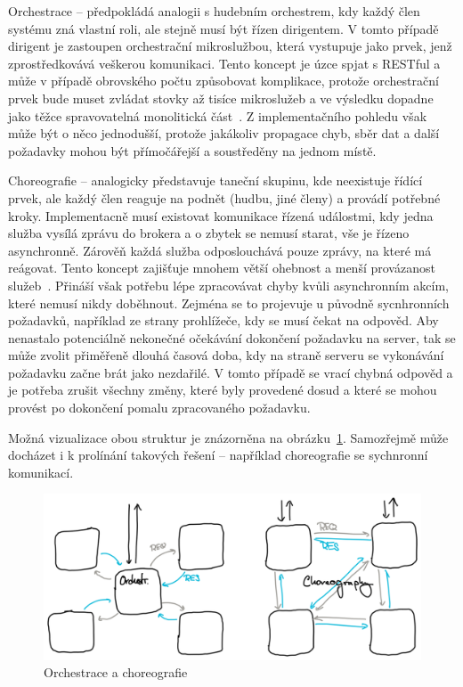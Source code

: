 \begin{dl}
   \item [Orchestrace] – předpokládá analogii s hudebním orchestrem, kdy každý člen systému zná vlastní roli, ale stejně musí být řízen dirigentem.
   V tomto případě dirigent je zastoupen orchestrační mikroslužbou, která vystupuje jako prvek, jenž zprostředkovává veškerou komunikaci.
   Tento koncept je úzce spjat s RESTful  a může v případě obrovského počtu  způsobovat komplikace, protože orchestrační prvek bude muset zvládat stovky až tisíce mikroslužeb a ve výsledku dopadne jako těžce spravovatelná monolitická část~\cite{choreovsorch}.
   Z implementačního pohledu však může být o něco jednodušší, protože jakákoliv propagace chyb, sběr dat a další požadavky mohou být přímočářejší a soustředěny na jednom místě.

   \item [Choreografie] – analogicky představuje taneční skupinu, kde neexistuje řídící prvek, ale každý člen reaguje na podnět (hudbu, jiné členy) a provádí potřebné kroky.
   Implementacně musí existovat komunikace řízená událostmi, kdy jedna služba vysílá zprávu do brokera a o zbytek se nemusí starat, vše je řízeno asynchronně.
   Zárověň každá služba odposlouchává pouze zprávy, na které má reágovat.
   Tento koncept zajišťuje mnohem větší ohebnost a menší provázanost služeb~\cite{choreovsorch}.
   Přináší však potřebu lépe zpracovávat chyby kvůli asynchronním akcím, které nemusí nikdy doběhnout.
   Zejména se to projevuje u původně sycnhronních požadavků, například ze strany prohlížeče, kdy se musí čekat na odpověd.
   Aby nenastalo potenciálně nekonečné očekávání dokončení požadavku na server, tak se může zvolit přiměřeně dlouhá časová doba, kdy na straně serveru se vykonávání požadavku začne brát jako nezdařilé.
   V tomto případě se vrací chybná odpověd a je potřeba zrušit všechny změny, které byly provedené dosud a které se mohou provést po dokončení pomalu zpracovaného požadavku.
\end{dl}

Možná vizualizace obou struktur je znázorněna na obrázku~\ref{fig:msa-structure-communication}.
Samozřejmě může docházet i k prolínání takových řešení – například choreografie se sychnronní komunikací.


\begin{figure}[htbp]
   \centering
   \includegraphics[max width=\textwidth]{assets/draft-msa-communication}
   \caption{Orchestrace a choreografie }\label{fig:msa-structure-communication}
\end{figure}




